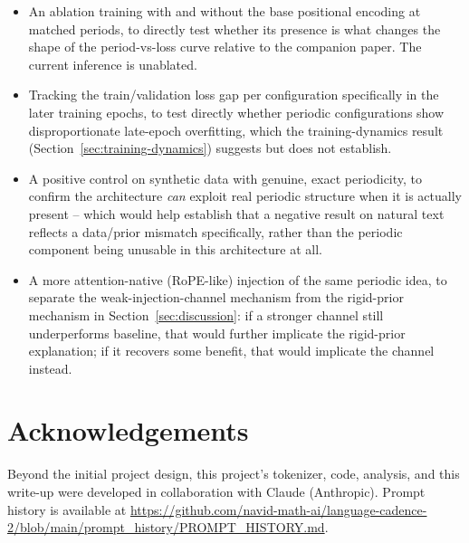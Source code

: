 \documentclass[11pt]{article}
\begin{document}
\begin{itemize}
\item An ablation training with and without the base positional encoding at matched periods, to directly test whether its presence is what changes the shape of the period-vs-loss curve relative to the companion paper. The current inference is unablated.
\item Tracking the train/validation loss gap per configuration specifically in the later training epochs, to test directly whether periodic configurations show disproportionate late-epoch overfitting, which the training-dynamics result (Section~\ref{sec:training-dynamics}) suggests but does not establish.
\item A positive control on synthetic data with genuine, exact periodicity, to confirm the architecture \emph{can} exploit real periodic structure when it is actually present -- which would help establish that a negative result on natural text reflects a data/prior mismatch specifically, rather than the periodic component being unusable in this architecture at all.
\item A more attention-native (RoPE-like) injection of the same periodic idea, to separate the weak-injection-channel mechanism from the rigid-prior mechanism in Section~\ref{sec:discussion}: if a stronger channel still underperforms baseline, that would further implicate the rigid-prior explanation; if it recovers some benefit, that would implicate the channel instead.
\end{itemize}

\section*{Acknowledgements}
Beyond the initial project design, this project's tokenizer, code, analysis, and this write-up were developed in collaboration with Claude (Anthropic). Prompt history is available at \url{https://github.com/navid-math-ai/language-cadence-2/blob/main/prompt_history/PROMPT_HISTORY.md}.
\end{document}
